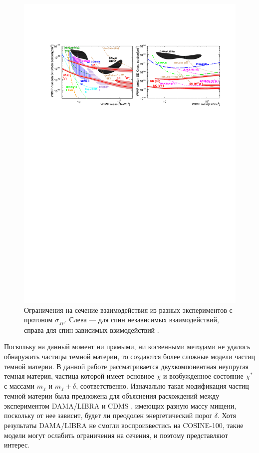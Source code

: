 \begin{figure}[htb]
	\begin{center}
		\includegraphics[scale=0.9]{images/SK_graphs.pdf}
		\caption{Ограничения на сечение взаимодействия из разных экспериментов с протоном $\sigma_{\chi p}$. Слева --- для спин независимых взаимодействий, справа для спин зависимых взимодействий \cite{kamiokandecollaboration2015search}.}		
	\end{center}
	\label{graph:constr}
\end{figure}

Поскольку на данный момент ни прямыми, ни косвенными методами не удалось обнаружить частицы темной материи, то создаются более сложные модели частиц темной материи.
В данной работе рассматривается двухкомпонентная неупругая темная материя, частица которой имеет основное $\chi$ и возбужденное состояние $\chi^*$ с массами $m_{\chi}$ и $m_{\chi}+\delta$, соответственно. Изначально такая модификация частиц темной материи была предложена для объяснения расхождений между экспериментом DAMA/LIBRA и CDMS \cite{PhysRevD.64.043502}, имеющих разную массу мищени, поскольку от нее зависит, будет ли преодолен энергетический порог $\delta$. Хотя результаты DAMA/LIBRA не смогли воспроизвестись на COSINE-100, такие модели могут ослабить ограничения на сечения, и поэтому представляют интерес.

